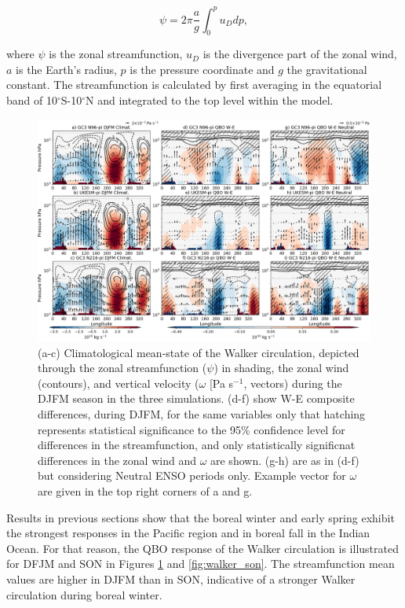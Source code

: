 \begin{equation}
\psi=2\pi \frac{a}{g} \int_0^p u_D dp,
\end{equation}

\noindent where $\psi$ is the zonal streamfunction, $u_D$ is the divergence part of the zonal wind, $a$ is the Earth's radius, $p$ is the pressure coordinate and $g$ the gravitational constant.
The streamfunction is calculated by first averaging in the equatorial band of 10$^\circ$S-10$^\circ$N and integrated to the top level within the model. 

\begin{figure}[t!]
\centering
 \noindent
 \includegraphics[width=\linewidth]{figures/cmip_streamdjfm.png}
\caption[Walker circulation anomalies in DJFM]{(a-c) Climatological mean-state of the Walker circulation, depicted through the zonal streamfunction ($\psi$) in shading, the zonal wind (contours), and vertical velocity ($\omega$ [Pa s$^{-1}$, vectors) during the DJFM season in the three simulations. (d-f) show W-E composite differences, during DJFM, for the same variables only that hatching represents statistical significance to the 95\% confidence level for differences in the streamfunction, and only statistically significnat differences in the zonal wind and $\omega$ are shown. (g-h) are as in (d-f) but considering Neutral ENSO periods only. Example vector for $\omega$ are given in the top right corners of a and g.  }
\label{fig:walker_djfm}
\end{figure}

Results in previous sections show that the boreal winter and early spring exhibit the strongest responses in the Pacific region and in boreal fall in the Indian Ocean. For that reason, the QBO response of the Walker circulation is illustrated for DFJM and SON in Figures \ref{fig:walker_djfm} and \ref{fig:walker_son}.
The streamfunction mean values are higher in DJFM than in SON, indicative of a stronger Walker circulation during boreal winter.

